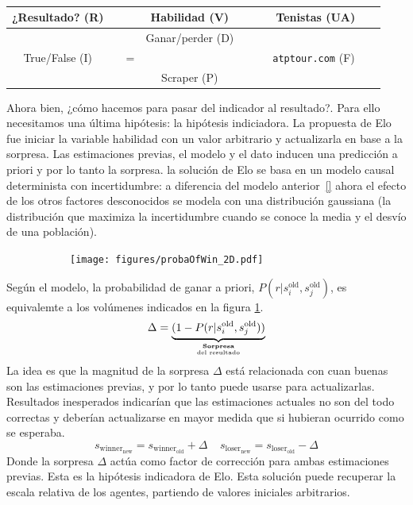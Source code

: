 \documentclass[a4paper,10pt]{book}
\newcommand\hfrac[2]{\genfrac{}{}{0pt}{}{#1}{#2}} %
\theoremstyle{definition}
\begin{document}

\begin{table}[ht!]
\centering
\begin{tabular}{clcccc}
¿Resultado? (R) & \multicolumn{1}{r|}{} &  & Habilidad (V) &  &  \multicolumn{1}{|c}{Tenistas (UA)} \\ \hline
   &  \multicolumn{1}{r|}{}    &  & Ganar/perder (D) &  & \multicolumn{1}{|r}{} \\
                 True/False (I)  &   & =  &  &  & \ \ \ \texttt{atptour.com} (F) \ \ \  \\
 & \multicolumn{1}{r|}{} &  & Scraper (P) &        &      \multicolumn{1}{|r}{}
\end{tabular}
\caption{}
\label{tab:operacionalizacion_habilidad}
\end{table}


Ahora bien, ¿c\'omo hacemos para pasar del indicador al resultado?.
Para ello necesitamos una última hip\'otesis: la hip\'otesis indiciadora.
La propuesta de Elo fue iniciar la variable habilidad con un valor arbitrario y actualizarla en base a la sorpresa.
Las estimaciones previas, el modelo y el dato inducen una predicci\'on a priori y por lo tanto la sorpresa.
la soluci\'on de Elo se basa en un modelo causal determinista con incertidumbre: a diferencia del modelo anterior~\ref{} ahora el efecto de los otros factores desconocidos se modela con una distribuci\'on gaussiana (la distribuci\'on que maximiza la incertidumbre cuando se conoce la media y el desvío de una poblaci\'on).
%
\begin{figure}[ht!]     
 \centering
   \begin{subfigure}[c]{0.49\textwidth}
       \texttt{[image: figures/probaOfWin\_2D.pdf]} 
     \label{fig:probaOfWin_2D}
    \end{subfigure}
\caption{}
\label{fig:elo}
\end{figure}
Según el modelo, la probabilidad de ganar a priori, $P(r|s_i^{\text{old}},s_j^{\text{old}})$, es equivalemte a los volúmenes indicados en la figura \ref{fig:probaOfWin_2D}.
\begin{equation*}
 \Delta = \underbrace{(1 - P(r|s_i^{\text{old}},s_j^{\text{old}}))}_{\hfrac{\textbf{Sorpresa}}{\text{del resultado}}}
\end{equation*}
La idea es que la magnitud de la sorpresa $\Delta$ est\'a relacionada con cuan buenas son las estimaciones previas, y por lo tanto puede usarse para actualizarlas.
Resultados inesperados indicar\'ian que las estimaciones actuales no son del todo correctas y deber\'ian actualizarse en mayor medida que si hubieran ocurrido como se esperaba.
\begin{equation}\label{eq:elo_update}
 s_{\text{winner}_\text{new}} = s_{\text{winner}_\text{old}} + \Delta \ \ \ \ \ s_{\text{loser}_\text{new}} = s_{\text{loser}_\text{old}} - \Delta 
\end{equation}
Donde la sorpresa $\Delta$ act\'ua como factor de correcci\'on para ambas estimaciones previas.
Esta es la hip\'otesis indicadora de Elo.
Esta soluci\'on puede recuperar la escala relativa de los agentes, partiendo de valores iniciales arbitrarios.
\end{document}
